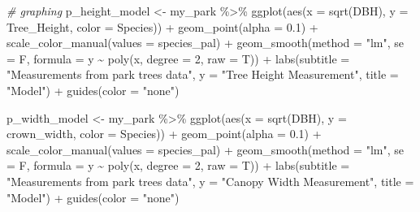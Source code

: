 \documentclass[12pt,twoside]{reedthesis}
\newenvironment{Shaded}{\begin{snugshade}}{\end{snugshade}}
\newcommand{\AttributeTok}[1]{\textcolor[rgb]{0.77,0.63,0.00}{#1}}
\newcommand{\CommentTok}[1]{\textcolor[rgb]{0.56,0.35,0.01}{\textit{#1}}}
\newcommand{\DecValTok}[1]{\textcolor[rgb]{0.00,0.00,0.81}{#1}}
\newcommand{\FloatTok}[1]{\textcolor[rgb]{0.00,0.00,0.81}{#1}}
\newcommand{\FunctionTok}[1]{\textcolor[rgb]{0.00,0.00,0.00}{#1}}
\newcommand{\NormalTok}[1]{#1}
\newcommand{\OtherTok}[1]{\textcolor[rgb]{0.56,0.35,0.01}{#1}}
\newcommand{\SpecialCharTok}[1]{\textcolor[rgb]{0.00,0.00,0.00}{#1}}
\newcommand{\StringTok}[1]{\textcolor[rgb]{0.31,0.60,0.02}{#1}}
\begin{document}
\begin{Shaded}
\begin{Highlighting}[]
\CommentTok{\# graphing}
\NormalTok{p\_height\_model }\OtherTok{\textless{}{-}}\NormalTok{ my\_park }\SpecialCharTok{\%\textgreater{}\%}
    \FunctionTok{ggplot}\NormalTok{(}\FunctionTok{aes}\NormalTok{(}\AttributeTok{x =} \FunctionTok{sqrt}\NormalTok{(DBH), }\AttributeTok{y =}\NormalTok{ Tree\_Height, }\AttributeTok{color =}\NormalTok{ Species)) }\SpecialCharTok{+}
    \FunctionTok{geom\_point}\NormalTok{(}\AttributeTok{alpha =} \FloatTok{0.1}\NormalTok{) }\SpecialCharTok{+} \FunctionTok{scale\_color\_manual}\NormalTok{(}\AttributeTok{values =}\NormalTok{ species\_pal) }\SpecialCharTok{+}
    \FunctionTok{geom\_smooth}\NormalTok{(}\AttributeTok{method =} \StringTok{"lm"}\NormalTok{, }\AttributeTok{se =}\NormalTok{ F, }\AttributeTok{formula =}\NormalTok{ y }\SpecialCharTok{\textasciitilde{}} \FunctionTok{poly}\NormalTok{(x,}
        \AttributeTok{degree =} \DecValTok{2}\NormalTok{, }\AttributeTok{raw =}\NormalTok{ T)) }\SpecialCharTok{+} \FunctionTok{labs}\NormalTok{(}\AttributeTok{subtitle =} \StringTok{"Measurements from park trees data"}\NormalTok{,}
    \AttributeTok{y =} \StringTok{"Tree Height Measurement"}\NormalTok{, }\AttributeTok{title =} \StringTok{"Model"}\NormalTok{) }\SpecialCharTok{+} \FunctionTok{guides}\NormalTok{(}\AttributeTok{color =} \StringTok{"none"}\NormalTok{)}

\NormalTok{p\_width\_model }\OtherTok{\textless{}{-}}\NormalTok{ my\_park }\SpecialCharTok{\%\textgreater{}\%}
    \FunctionTok{ggplot}\NormalTok{(}\FunctionTok{aes}\NormalTok{(}\AttributeTok{x =} \FunctionTok{sqrt}\NormalTok{(DBH), }\AttributeTok{y =}\NormalTok{ crown\_width, }\AttributeTok{color =}\NormalTok{ Species)) }\SpecialCharTok{+}
    \FunctionTok{geom\_point}\NormalTok{(}\AttributeTok{alpha =} \FloatTok{0.1}\NormalTok{) }\SpecialCharTok{+} \FunctionTok{scale\_color\_manual}\NormalTok{(}\AttributeTok{values =}\NormalTok{ species\_pal) }\SpecialCharTok{+}
    \FunctionTok{geom\_smooth}\NormalTok{(}\AttributeTok{method =} \StringTok{"lm"}\NormalTok{, }\AttributeTok{se =}\NormalTok{ F, }\AttributeTok{formula =}\NormalTok{ y }\SpecialCharTok{\textasciitilde{}} \FunctionTok{poly}\NormalTok{(x,}
        \AttributeTok{degree =} \DecValTok{2}\NormalTok{, }\AttributeTok{raw =}\NormalTok{ T)) }\SpecialCharTok{+} \FunctionTok{labs}\NormalTok{(}\AttributeTok{subtitle =} \StringTok{"Measurements from park trees data"}\NormalTok{,}
    \AttributeTok{y =} \StringTok{"Canopy Width Measurement"}\NormalTok{, }\AttributeTok{title =} \StringTok{"Model"}\NormalTok{) }\SpecialCharTok{+} \FunctionTok{guides}\NormalTok{(}\AttributeTok{color =} \StringTok{"none"}\NormalTok{)}


\end{Highlighting}
\end{Shaded}
\end{document}
